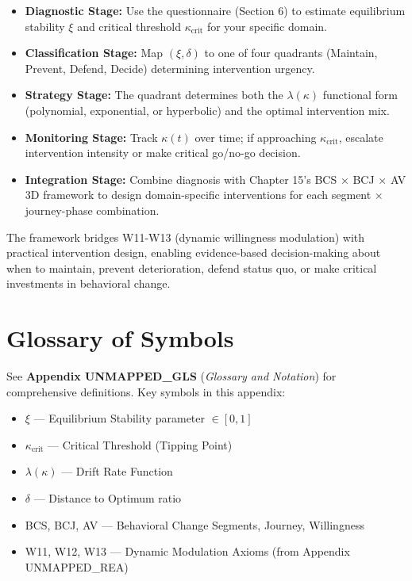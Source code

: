 \documentclass[11pt, a4paper]{article}
\begin{document}
\begin{itemize}
    \item \textbf{Diagnostic Stage:} Use the questionnaire (Section 6) to estimate equilibrium stability $\xi$ and critical threshold $\kappa_{\text{crit}}$ for your specific domain.

    \item \textbf{Classification Stage:} Map $(\xi, \delta)$ to one of four quadrants (Maintain, Prevent, Defend, Decide) determining intervention urgency.

    \item \textbf{Strategy Stage:} The quadrant determines both the $\lambda(\kappa)$ functional form (polynomial, exponential, or hyperbolic) and the optimal intervention mix.

    \item \textbf{Monitoring Stage:} Track $\kappa(t)$ over time; if approaching $\kappa_{\text{crit}}$, escalate intervention intensity or make critical go/no-go decision.

    \item \textbf{Integration Stage:} Combine diagnosis with Chapter 15's BCS × BCJ × AV 3D framework to design domain-specific interventions for each segment × journey-phase combination.
\end{itemize}

The framework bridges W11-W13 (dynamic willingness modulation) with practical intervention design, enabling evidence-based decision-making about when to maintain, prevent deterioration, defend status quo, or make critical investments in behavioral change.


\section{Glossary of Symbols}
\label{sec:bb-glossary}

See \textbf{Appendix UNMAPPED_GLS} (\textit{Glossary and Notation}) for comprehensive definitions.
Key symbols in this appendix:

\begin{itemize}[nosep]
    \item $\xi$ --- Equilibrium Stability parameter $\in [0,1]$
    \item $\kappa_{\text{crit}}$ --- Critical Threshold (Tipping Point)
    \item $\lambda(\kappa)$ --- Drift Rate Function
    \item $\delta$ --- Distance to Optimum ratio
    \item BCS, BCJ, AV --- Behavioral Change Segments, Journey, Willingness
    \item W11, W12, W13 --- Dynamic Modulation Axioms (from Appendix UNMAPPED_REA)
\end{itemize}
\end{document}
